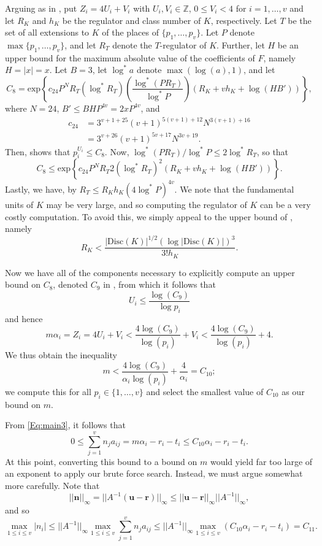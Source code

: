 {Arguing as in \cite{BugeaudGyory}, put $Z_i = 4U_i + V_i$ with $U_i, V_i \in \mathbb{Z}$, $0 \leq V_i < 4$ for $i = 1, \dots, v$ and let $R_K$ and $h_K$ be the regulator and class number of $K$, respectively. Let $T$ be the set of all extensions to $K$ of the places of $\{p_1, \dots, p_v\}$. Let $P$ denote $\max\{p_1, \dots, p_v\}$, and let $R_T$ denote the $T$-regulator of $K$. Further, let $H$ be an upper bound for the maximum absolute value of the coefficients of $F$, namely $H = |x| = x$. Let $B = 3$, let $\log^*{a}$ denote $\max(\log(a), 1)$, and let
\[C_8 = \text{exp}\left\{c_{24}P^N R_T (\log^*R_T)\left(\frac{\log^*(PR_T)}{\log^*P}\right)(R_{K} + vh_{K} + \log(HB'))\right\},\]
where $N = 24$, $B' \leq BHP^{4v} = 2xP^{4v}$, and 
\[\begin{array}{cc}
c_{24}  & = 3^{v+1 +25}(v+1)^{5(v+1) +12} N^{3(v+1)+16} \\
	& = 3^{v + 26}(v+1)^{5v+17}N^{3v + 19}.
\end{array}\]
Then, \cite{BugeaudGyory} shows that $p_i^{U_i} \leq C_8$. Now, ${\log^*(PR_T)/\log^*P \leq 2\log^*R_T}$, so that 
\[C_8 \leq \text{exp}\left\{c_{24}P^N R_T 2(\log^*R_T)^2(R_{K} + vh_{K} + \log(HB'))\right\}.\] 
Lastly, we have, by \cite{BugeaudGyory} $R_T \leq R_Kh_K(4\log^*P)^{4v}$. We note that the fundamental units of $K$ may be very large, and so computing the regulator of $K$ can be a very costly computation. To avoid this, we simply appeal to the upper bound of \cite{BugeaudGyory}, namely
\[R_K < \frac{|\text{Disc}(K)|^{1/2}(\log|\text{Disc}(K)|)^{3}}{3!h_K}.\]

Now we have all of the components necessary to explicitly compute an upper bound on $C_8$, denoted $C_9$ in \cite{BugeaudGyory}, from which it follows that
\[U_i \leq \frac{\log(C_9)}{\log{p_i}}\]
and hence
\[m\alpha_i = Z_i = 4U_i + V_i < \frac{4\log(C_9)}{\log(p_i)} + V_i < \frac{4\log(C_9)}{\log(p_i)} + 4.\] 
We thus obtain the inequality  
\[m < \frac{4\log(C_9)}{\alpha_i\log(p_i)} + \frac{4}{\alpha_i} = C_{10};\]
we compute this for all $p_i \in \{1, \dots, v\}$ and select the smallest value of $C_{10}$ as our bound on $m$. 
 
From \eqref{Eq:main3}, it follows that
\[0 \leq \sum_{j=1}^v n_ja_{ij} = m\alpha_i - r_i - t_i \leq C_{10}\alpha_i - r_i - t_i.\]
At this point, converting this bound to a bound on $m$ would yield far too large of an exponent to apply our brute force search. Instead, we must argue somewhat more carefully. 
Note that 
\[||\mathbf{n}||_{\infty} = ||A^{-1}(\mathbf{u} - \mathbf{r})||_{\infty} \leq ||\mathbf{u} - \mathbf{r}||_{\infty}||A^{-1}||_{\infty},\]
and so
\[\max_{1 \leq i \leq v}|n_i| \leq ||A^{-1}||_{\infty}\max_{1 \leq i\leq v}\sum_{j = 1}^v n_j a_{ij}
\leq ||A^{-1}||_{\infty} \max_{1 \leq i\leq v}(C_{10}\alpha_i - r_i - t_i) = C_{11}.\]

}
